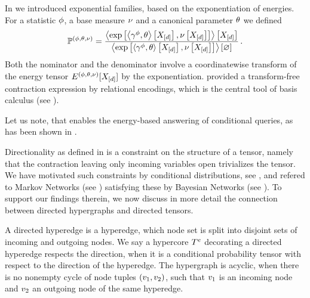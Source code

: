 \begin{example}
    In  we introduced exponential families, based on the exponentiation of energies.
    For a statistic $\phi$, a base measure $\nu$ and a canonical parameter $\theta$ we defined
    \begin{align*}
        \mathbb{P}^{(\phi,\theta,\nu)} = \frac{
            \left\langle \mathrm{exp}\left[\left\langle \gamma^{\phi},\theta\right\rangle \left[ X_{[d]} \right],\nu\left[X_{[d]}\right]\right]\right\rangle \left[ X_{[d]} \right]
        }{
            \left\langle \mathrm{exp}\left[\left\langle \gamma^{\phi},\theta\right\rangle \left[ X_{[d]} \right],\nu\left[X_{[d]}\right]\right]\right\rangle \left[ \varnothing \right]
        } \, .
    \end{align*}
    Both the nominator and the denominator involve a coordinatewise transform of the energy tensor $E^{(\phi,\theta,\nu)}[X_{[d]}]$ by the exponentiation.
     provided a transform-free contraction expression by relational encodings, which is the central tool of basis calculus (see ).

    Let us note, that  enables the energy-based answering of conditional queries, as has been shown in .
\end{example}





Directionality as defined in  is a constraint on the structure of a tensor, namely that the contraction leaving only incoming variables open trivializes the tensor.
We have motivated such constraints by conditional distributions, see , and refered to Markov Networks (see ) satisfying these by Bayesian Networks (see ).
To support our findings therein, we now discuss in more detail the connection between directed hypergraphs and directed tensors.

\begin{definition}
    A directed hyperedge is a hyperedge, which node set is split into disjoint sets of incoming and outgoing nodes.
    We say a hypercore $T^{e}$ decorating a directed hyperedge respects the direction, when it is a conditional probability tensor with respect to the direction of the hyperedge.
    The hypergraph is acyclic, when there is no nonempty cycle of node tuples $(v_1,v_2)$, such that $v_1$ is an incoming node and $v_2$ an outgoing node of the same hyperedge.
\end{definition}

